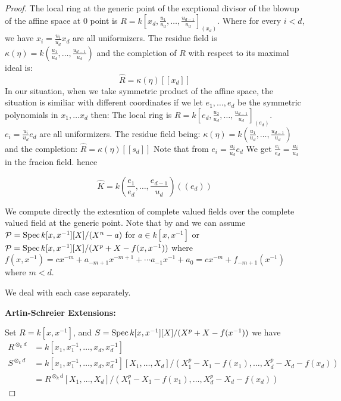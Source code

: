 \begin{proof}
    The local ring at the generic point of the excptional divisor of the blowup of the affine space at 0 point is
     $R = k[x_d, \frac{u_1}{u_d}, \dots, \frac{u_{d-1}}{u_d}]_{(x_d)}$. 
     Where for every  $i < d$, we have $x_i = \frac{u_i}{u_d} x_d$ are all uniformizers.
     The residue field is $\kappa(\eta) = k(\frac{u_1}{u_d}, \dots, \frac{u_{d-1}}{u_d})$
     and the completion of $R$ with respect to its maximal ideal is:
     $$\hat{R} = \kappa(\eta)[[x_d]]$$
     In our situation, when we take symmetric product of the affine space, the situation is similiar with different coordinates
     if we let $e_1, \dots, e_d$ be the symmetric polynomials in $x_1, \dots x_d$ then:
     The local ring is 
     $R = k[e_d, \frac{u_2}{u_d}, \dots, \frac{u_{d-1}}{u_d}]_{(e_d)}$. 
     $e_i = \frac{u_i}{u_d} e_d$ are all uniformizers.
     The residue field being:
     $\kappa(\eta) = k(\frac{u_1}{u_d}, \dots, \frac{u_{d-1}}{u_d})$
     and the completion: $\hat{R} = \kappa(\eta)[[s_d]]$
     Note that from  $e_i = \frac{u_i}{u_d} e_d$
     We get  $\frac{e_i}{e_d} = \frac{u_i}{u_d}$ in the fracion field. hence

     \begin{equation}\label{eq:complete_field_at_generic_point:reorg}
          \hat{K}= k(\frac{e_1}{e_d}, \dots, \frac{e_{d-1}}{u_d})((e_d))
     \end{equation}

     We compute directly the extesntion of complete valued fields over the complete valued field at the generic point. 
     Note that by  and 
     we can assume $\mathcal{P} = \operatorname{Spec} k[x, x^{-1}][X]/(X^n - a)$ for $a \in k[x, x^{-1}]$ or $\mathcal{P} = \operatorname{Spec} k[x, x^{-1}][X]/(X^p + X - f(x, x^{-1}))$
     where $f(x,x^{-1}) = c x^{-m} + a_{-m + 1} x^{-m + 1} + \cdots a_{-1}x^{-1} + a_0 = c x^{-m} + f_{-m+1}(x^{-1})$ where $m < d$.
     
     We deal with each case separately. 
     
     \textbf{Artin-Schreier Extensions:}

     Set $R=k[x, x^{-1}]$, and $S = \operatorname{Spec} k[x, x^{-1}][X]/(X^p + X - f(x^{-1}))$
     we have 
     $$
          \begin{aligned}
          R^{\otimes_k d} &= k[x_1, x_1^{-1}, \dots, x_d, x_d^{-1}] \\
          S^{\otimes_k d} &= k[x_1, x_1^{-1}, \dots, x_d, x_d^{-1}][X_1, \dots, X_d] / (X_1^p - X_1 - f(x_1), \dots, X_d^p - X_d - f(x_d)) \\
          &= R^{\otimes_k d}[X_1, \dots, X_d] / (X_1^p - X_1 - f(x_1), \dots, X_d^p - X_d - f(x_d))
          \end{aligned}
     $$


\end{proof}
